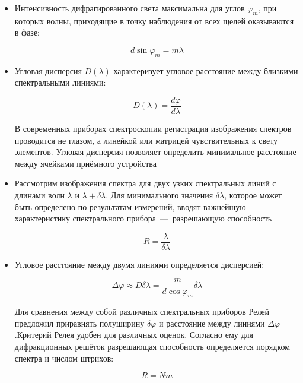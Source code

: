 \documentclass[a4paper, 12pt]{article}
\renewcommand{\phi}{\varphi}
\begin{document}
\begin{itemize}
    \item Интенсивность дифрагированного света максимальна для углов $\phi_m$, при которых волны, приходящие в точку наблюдения от всех щелей оказываются в фазе: 
    
    \begin{equation}
        \label{huinya1}
        d \sin \phi_m = m \lambda
    \end{equation}

    \item Угловая дисперсия $D(\lambda)$ характеризует угловое расстояние между близкими спектральными линиями:
    
    \begin{equation}
        \label{huinya2}
        D(\lambda) = \dfrac{d\phi}{d\lambda}
    \end{equation}

    В современных приборах спектроскопии регистрация изображения спектров проводится не глазом, а линейкой или матрицей чувствительных к свету элементов. Угловая дисперсия позволяет определить минимальное расстояние между ячейками приёмного устройства

    \item Рассмотрим изображения спектра для двух узких спектральных линий с длинами волн $\lambda$ и $\lambda + \delta \lambda$. Для минимального значения $\delta \lambda$, которое может быть определено по результатам измерений, вводят важнейшую
    характеристику спектрального прибора~---~разрешающую способность

    \begin{equation}
        \label{huinya3}
        R = \dfrac{\lambda}{\delta \lambda}
    \end{equation}

    \item Угловое расстояние между двумя линиями определяется дисперсией:
    
    \begin{equation}
        \Delta \phi \approx D \delta \lambda = \dfrac{m}{d \cos \phi_m} \delta \lambda
    \end{equation}

    Для сравнения между собой различных спектральных приборов Релей предложил приравнять полуширину $\delta \phi$ и расстояние между линиями $\Delta \phi$.Критерий Релея удобен для различных оценок. Согласно ему для дифракционных решёток разрешающая способность определяется порядком спектра и числом штрихов:

    \begin{equation}
        R = N m
    \end{equation}
\end{itemize}
\end{document}
